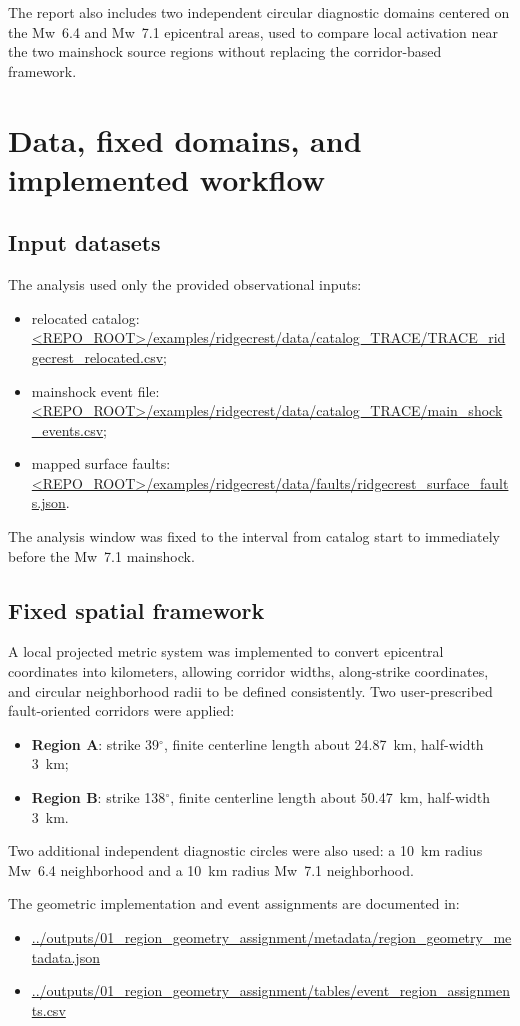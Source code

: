 \documentclass[11pt]{article}
\begin{document}
The report also includes two independent circular diagnostic domains centered on the Mw~6.4 and Mw~7.1 epicentral areas, used to compare local activation near the two mainshock source regions without replacing the corridor-based framework.

\section{Data, fixed domains, and implemented workflow}
\subsection{Input datasets}
The analysis used only the provided observational inputs:
\begin{itemize}
    \item relocated catalog: \url{<REPO_ROOT>/examples/ridgecrest/data/catalog_TRACE/TRACE_ridgecrest_relocated.csv};
    \item mainshock event file: \url{<REPO_ROOT>/examples/ridgecrest/data/catalog_TRACE/main_shock_events.csv};
    \item mapped surface faults: \url{<REPO_ROOT>/examples/ridgecrest/data/faults/ridgecrest_surface_faults.json}.
\end{itemize}
The analysis window was fixed to the interval from catalog start to immediately before the Mw~7.1 mainshock.

\subsection{Fixed spatial framework}
A local projected metric system was implemented to convert epicentral coordinates into kilometers, allowing corridor widths, along-strike coordinates, and circular neighborhood radii to be defined consistently. Two user-prescribed fault-oriented corridors were applied:
\begin{itemize}
    \item \textbf{Region A}: strike 39$^{\circ}$, finite centerline length about 24.87~km, half-width 3~km;
    \item \textbf{Region B}: strike 138$^{\circ}$, finite centerline length about 50.47~km, half-width 3~km.
\end{itemize}
Two additional independent diagnostic circles were also used: a 10~km radius Mw~6.4 neighborhood and a 10~km radius Mw~7.1 neighborhood.

The geometric implementation and event assignments are documented in:
\begin{itemize}
    \item \url{../outputs/01_region_geometry_assignment/metadata/region_geometry_metadata.json}
    \item \url{../outputs/01_region_geometry_assignment/tables/event_region_assignments.csv}
\end{itemize}
\end{document}
